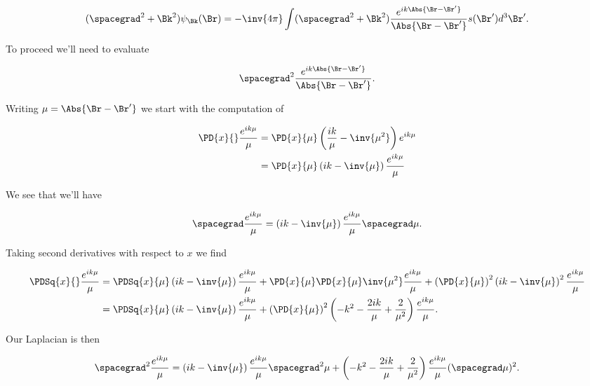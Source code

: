 \begin{equation}\label{eqn:helmholtzGreens:90}
(\spacegrad^2 + \Bk^2) \psi_\Bk(\Br) = 
- \inv{4 \pi} 
\int (\spacegrad^2 + \Bk^2) 
\frac{e^{i k \Abs{\Br - \Br'}} }{\Abs{\Br - \Br'}}
s(\Br') d^3 \Br'.
\end{equation}

To proceed we'll need to evaluate 

\begin{equation}\label{eqn:helmholtzGreens:110}
\spacegrad^2 \frac{e^{i k \Abs{\Br - \Br'}} }{\Abs{\Br - \Br'}}.
\end{equation}

Writing $\mu = \Abs{\Br - \Br'}$ we start with the computation of

\begin{align*}
\PD{x}{} \frac{e^{i k \mu} }{\mu}
&=
\PD{x}{\mu} \left( \frac{i k}{\mu} - \inv{\mu^2} \right) e^{i k \mu} \\
&=
\PD{x}{\mu} \left( i k - \inv{\mu} \right) \frac{e^{i k \mu}}{\mu}
\end{align*}

We see that we'll have

\begin{equation}\label{eqn:helmholtzGreens:130}
\spacegrad \frac{e^{i k \mu} }{\mu} = \left( i k - \inv{\mu} \right) \frac{e^{i k \mu}}{\mu} \spacegrad \mu.
\end{equation}

Taking second derivatives with respect to $x$ we find

\begin{align*}
\PDSq{x}{} \frac{e^{i k \mu} }{\mu}
&=
\PDSq{x}{\mu} \left( i k - \inv{\mu} \right) \frac{e^{i k \mu}}{\mu}
+\PD{x}{\mu} \PD{x}{\mu} \inv{\mu^2} \frac{e^{i k \mu}}{\mu}
+\left( \PD{x}{\mu} \right)^2 \left( i k - \inv{\mu} \right)^2 \frac{e^{i k \mu}}{\mu} \\
&=
\PDSq{x}{\mu} \left( i k - \inv{\mu} \right) \frac{e^{i k \mu}}{\mu}
+\left( \PD{x}{\mu} \right)^2 
\left( -k^2 - \frac{ 2 i k }{\mu} + \frac{2}{\mu^2} \right)
\frac{e^{i k \mu}}{\mu}.
\end{align*}

Our Laplacian is then

\begin{equation}\label{eqn:helmholtzGreens:150}
\spacegrad^2
\frac{e^{i k \mu} }{\mu} =
\left( i k - \inv{\mu} \right) \frac{e^{i k \mu}}{\mu} \spacegrad^2 \mu
+
\left( -k^2 - \frac{ 2 i k }{\mu} + \frac{2}{\mu^2} \right)
\frac{e^{i k \mu}}{\mu} (\spacegrad \mu)^2.
\end{equation}

